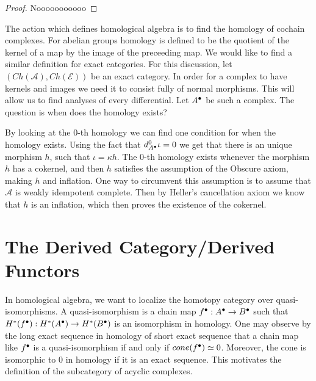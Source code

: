     \begin{proof}
        Nooooooooooo
    \end{proof}

    The action which defines homological algebra is to find the homology of cochain complexes. For abelian groups homology is defined to be the quotient of the kernel of a map by the image of the preceeding map. We would like to find a similar definition for exact categories. For this discussion, let $(Ch(\mathcal{A}),Ch(\mathcal{E}))$ be an exact category. In order for a complex to have kernels and images we need it to consist fully of normal morphisms. This will allow us to find analyses of every differential. Let $A^{\bullet}$ be such a complex. The question is when does the homology exists?

    \begin{center}
    \end{center}

    By looking at the 0-th homology we can find one condition  for when the homology exists. Using the fact that $d^0_{A^{\bullet}}\iota = 0$ we get that there is an unique morphism $h$, such that $\iota = \kappa h$. The 0-th homology exists whenever the morphism $h$ has a cokernel, and then $h$ satisfies the assumption of the Obscure axiom, making $h$ and inflation. One way to circumvent this assumption is to assume that $\mathcal{A}$ is weakly idempotent complete. Then by Heller's cancellation axiom we know that $h$ is an inflation, which then proves the existence of the cokernel. 

    
\section{The Derived Category/Derived Functors}  
    
    In homological algebra, we want to localize the homotopy category over quasi-isomorphisms. A quasi-isomorphism is a chain map $f^{\bullet}:A^{\bullet}\rightarrow B^{\bullet}$ such that $H^*(f^{\bullet}):H^*(A^{\bullet})\rightarrow H^*(B^{\bullet})$ is an isomorphism in homology. One may observe by the long exact sequence in homology of short exact sequence that a chain map like $f^{\bullet}$ is a quasi-isomorphism if and only if $cone(f^{\bullet})\simeq 0$. Moreover, the cone is isomorphic to $0$ in homology if it is an exact sequence. This motivates the definition of the subcategory of acyclic complexes.

